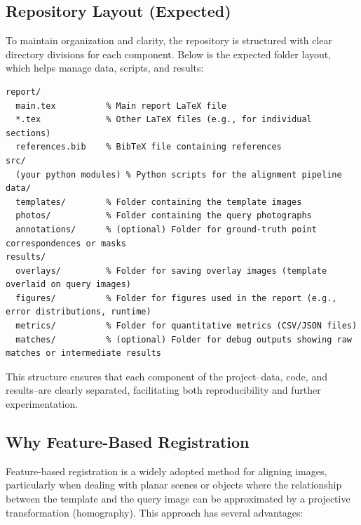 \subsection{Repository Layout (Expected)}
To maintain organization and clarity, the repository is structured with clear directory divisions for each component. Below is the expected folder layout, which helps manage data, scripts, and results:

\begin{verbatim}
report/
  main.tex          % Main report LaTeX file
  *.tex             % Other LaTeX files (e.g., for individual sections)
  references.bib    % BibTeX file containing references
src/
  (your python modules) % Python scripts for the alignment pipeline
data/
  templates/        % Folder containing the template images
  photos/           % Folder containing the query photographs
  annotations/      % (optional) Folder for ground-truth point correspondences or masks
results/
  overlays/         % Folder for saving overlay images (template overlaid on query images)
  figures/          % Folder for figures used in the report (e.g., error distributions, runtime)
  metrics/          % Folder for quantitative metrics (CSV/JSON files)
  matches/          % (optional) Folder for debug outputs showing raw matches or intermediate results
\end{verbatim}

This structure ensures that each component of the project--data, code, and results--are clearly separated, facilitating both reproducibility and further experimentation.

\subsection{Why Feature-Based Registration}
Feature-based registration is a widely adopted method for aligning images, particularly when dealing with planar scenes or objects where the relationship between the template and the query image can be approximated by a projective transformation (homography). This approach has several advantages:

